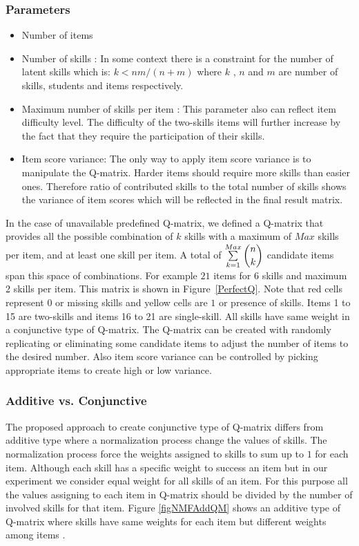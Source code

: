 \subsubsection{Parameters}
\begin{itemize}
\item Number of items 
\item Number of skills : In some context there is a constraint for the number of latent skills which is: $k<nm/(n+m)$ \protect\citep{lee1999learning} where $k$ , $n$ and $m$ are number of skills, students and items respectively.
\item Maximum number of skills per item : This parameter also can reflect item difficulty level. The difficulty of the two-skills items will further increase by the fact that they require the participation of their skills.
\item Item score variance: The only way to apply item score variance is to manipulate the Q-matrix. Harder items should require more skills than easier ones. Therefore ratio of contributed skills to the total number of skills shows the variance of item scores which will be reflected in the final result matrix.

\end{itemize}

In the case of unavailable predefined Q-matrix, we defined a Q-matrix that provides all the possible combination of $k$ skills with a maximum of $Max$ skills per item, and at least one skill per item. A total of $\sum\limits_{k=1}^{Max} \dbinom{n}{k}$ candidate items span this space of combinations. For example $21$ items for 6 skills and maximum 2 skills per item. This matrix is shown in Figure~\ref{PerfectQ}. Note that red cells represent $0$ or missing skills and yellow cells are $1$ or presence of skills. Items 1 to 15 are two-skills and items 16 to 21 are single-skill. All skills have same weight in a conjunctive type of Q-matrix. The Q-matrix can be created with randomly replicating or eliminating some candidate items to adjust the number of items to the desired number. Also item score variance can be controlled by picking appropriate items to create high or low variance.

\subsubsection{Additive vs. Conjunctive}
The proposed approach to create conjunctive type of Q-matrix differs from additive type where a normalization process change the values of skills. The normalization process force the weights assigned to skills to sum up to $1$ for each item. Although each skill has a specific weight to success an item but in our experiment we consider equal weight for all skills of an item. For this purpose all the values assigning to each item in Q-matrix should be divided by the number of involved skills for that item. Figure \ref{figNMFAddQM} shows an additive type of Q-matrix where skills have same weights for each item but different weights among items . 



